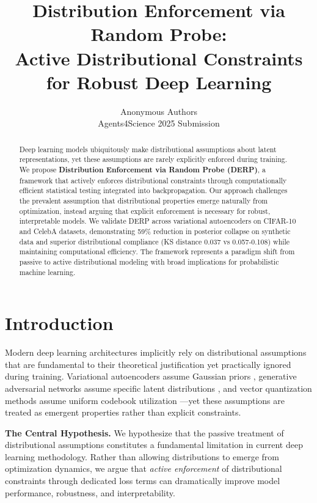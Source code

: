 \documentclass[11pt]{article}
\title{Distribution Enforcement via Random Probe:\\
Active Distributional Constraints for Robust Deep Learning}
\author{
    Anonymous Authors\\
    Agents4Science 2025 Submission
}
\date{}
\begin{document}
\maketitle

\begin{abstract}
Deep learning models ubiquitously make distributional assumptions about latent representations, yet these assumptions are rarely explicitly enforced during training. We propose \textbf{Distribution Enforcement via Random Probe (DERP)}, a framework that actively enforces distributional constraints through computationally efficient statistical testing integrated into backpropagation. Our approach challenges the prevalent assumption that distributional properties emerge naturally from optimization, instead arguing that explicit enforcement is necessary for robust, interpretable models. We validate DERP across variational autoencoders on CIFAR-10 and CelebA datasets, demonstrating 59\% reduction in posterior collapse on synthetic data and superior distributional compliance (KS distance 0.037 vs 0.057-0.108) while maintaining computational efficiency. The framework represents a paradigm shift from passive to active distributional modeling with broad implications for probabilistic machine learning.
\end{abstract}

\section{Introduction}

Modern deep learning architectures implicitly rely on distributional assumptions that are fundamental to their theoretical justification yet practically ignored during training. Variational autoencoders assume Gaussian priors \cite{kingma2014auto}, generative adversarial networks assume specific latent distributions \cite{goodfellow2014generative}, and vector quantization methods assume uniform codebook utilization \cite{oord2017neural}—yet these assumptions are treated as emergent properties rather than explicit constraints.

\textbf{The Central Hypothesis.} We hypothesize that the passive treatment of distributional assumptions constitutes a fundamental limitation in current deep learning methodology. Rather than allowing distributions to emerge from optimization dynamics, we argue that \emph{active enforcement} of distributional constraints through dedicated loss terms can dramatically improve model performance, robustness, and interpretability.
\end{document}
